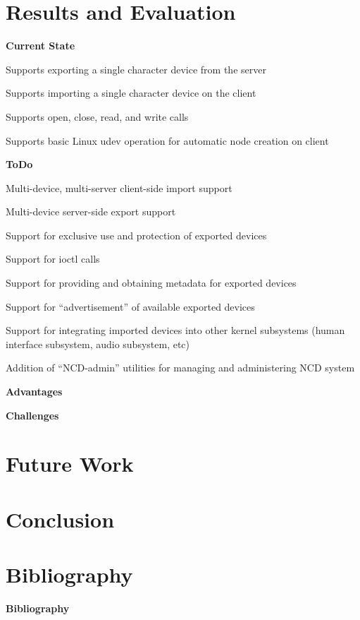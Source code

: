 \documentclass[xcolor=dvipsnames]{beamer}
\newenvironment{packed_item}{
\begin{itemize}
  \setlength{\itemsep}{1pt}
  \setlength{\parskip}{0pt}
  \setlength{\parsep}{0pt}
}{\end{itemize}}
\begin{document}
\section{Results and Evaluation}
\begin{frame}{\bf Current State}

\begin{packed_item}
\item Supports exporting a single character device from the server
\item Supports importing a single character device on the client
\item Supports open, close, read, and write calls
\item Supports basic Linux udev operation for automatic node creation on client
\end{packed_item}

\end{frame}

\begin{frame}{\bf ToDo}

\begin{packed_item}
\item Multi-device, multi-server client-side import support
\item Multi-device server-side export support
\item Support for exclusive use and protection of exported devices
\item Support for ioctl calls
\item Support for providing and obtaining metadata for exported
  devices
\item Support for ``advertisement'' of available exported devices
\item Support for integrating imported devices into other kernel
  subsystems (human interface subsystem, audio subsystem, etc)
\item Addition of ``NCD-admin'' utilities for managing and administering
  NCD system
\end{packed_item}

\end{frame}

\begin{frame}{\bf Advantages}

\end{frame}

\begin{frame}{\bf Challenges}

\end{frame}

\section{Future Work}

\section{Conclusion}

\section{Bibliography}
\begin{frame}{\bf Bibliography}



\end{frame}
\end{document}

